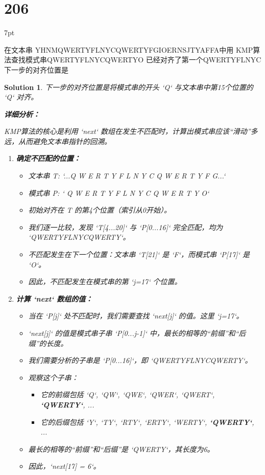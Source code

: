 \documentclass[UTF8]{report}
\newtheorem{solution}{Solution}
\theoremstyle{MyLineTheoremStyle} %
\theoremstyle{MyBlockTheoremStyle} %
\theoremstyle{MySubsubsectionStyle} %
\newenvironment{graybox}{%
        \def\FrameCommand{%
        \hspace{1pt}%
        {\color{gray}\small \vrule width 2pt}%
        {\color{graybox_color}\vrule width 4pt}%
        \colorbox{graybox_color}%
        }%
        \MakeFramed{\advance\hsize-\width\FrameRestore}%
        \noindent\hspace{-4.55pt}%
        \begin{adjustwidth}{}{7pt}%
        \vspace{2pt}\vspace{2pt}%
        }
        {%
        \vspace{2pt}\end{adjustwidth}\endMakeFramed%
        }
\begin{document}
\section*{206}
\begin{graybox}
在文本串
YHNMQWERTYFLNYCQWERTYFGIOERNSJTYAFFA中用
KMP算法查找模式串QWERTYFLNYCQWERTYO
已经对齐了第一个QWERTYFLNYC
下一步的对齐位置是
\end{graybox}

\begin{solution}
下一步的对齐位置是将模式串的开头 `Q` 与文本串中第15个位置的 `Q` 对齐。

\textbf{详细分析：}

KMP算法的核心是利用 `next` 数组在发生不匹配时，计算出模式串应该“滑动”多远，从而避免文本串指针的回溯。

\begin{enumerate}
    \item \textbf{确定不匹配的位置：}
    \begin{itemize}
        \item 文本串 T: `...Q W E R T Y F L N Y C Q W E R T Y F G...`
        \item 模式串 P: `  Q W E R T Y F L N Y C Q W E R T Y O`
        \item 初始对齐在 T 的第4个位置（索引从0开始）。
        \item 我们逐一比较，发现 `T[4...20]` 与 `P[0...16]` 完全匹配，均为 `QWERTYFLNYCQWERTY`。
        \item 不匹配发生在下一个位置：文本串 `T[21]` 是 `F`，而模式串 `P[17]` 是 `O`。
        \item 因此，不匹配发生在模式串的第 `j=17` 个位置。
    \end{itemize}

    \item \textbf{计算 `next` 数组的值：}
    \begin{itemize}
        \item 当在 `P[j]` 处不匹配时，我们需要查找 `next[j]` 的值。这里 `j=17`。
        \item `next[j]` 的值是模式串子串 `P[0...j-1]` 中，最长的相等的“前缀”和“后缀”的长度。
        \item 我们需要分析的子串是 `P[0...16]`，即 `QWERTYFLNYCQWERTY`。
        \item 观察这个子串：
        \begin{itemize}
            \item 它的前缀包括 `Q`, `QW`, `QWE`, `QWER`, `QWERT`, \textbf{`QWERTY`}, ...
            \item 它的后缀包括 `Y`, `TY`, `RTY`, `ERTY`, `WERTY`, \textbf{`QWERTY`}, ...
        \end{itemize}
        \item 最长的相等的“前缀”和“后缀”是 `QWERTY`，其长度为6。
        \item 因此，`next[17] = 6`。
    \end{itemize}


\end{enumerate}
\end{solution}
\end{document}
